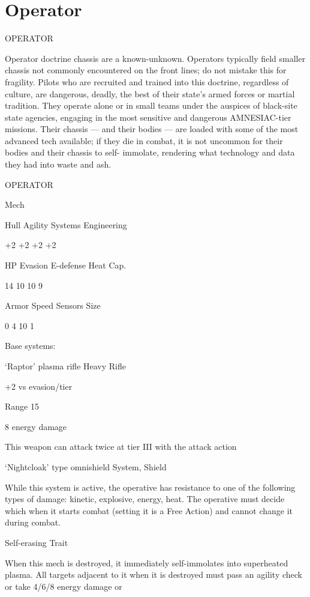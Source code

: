 \section{Operator}

                                              OPERATOR

Operator doctrine chassis are a known-unknown. Operators typically field smaller chassis not
commonly encountered on the front lines; do not mistake this for fragility. Pilots who are recruited
and trained into this doctrine, regardless of culture, are dangerous, deadly, the best of their
state’s armed forces or martial tradition. They operate alone or in small teams under the auspices
of black-site state agencies, engaging in the most sensitive and dangerous AMNESIAC-tier
missions. Their chassis — and their bodies — are loaded with some of the most advanced tech
available; if they die in combat, it is not uncommon for their bodies and their chassis to self-
immolate, rendering what technology and data they had into waste and ash.


 OPERATOR

 Mech

 Hull       Agility      Systems       Engineering

 +2         +2           +2            +2

 HP         Evasion      E-defense     Heat Cap.

 14         10           10            9

 Armor      Speed        Sensors       Size

 0          4            10            1

Base systems:

‘Raptor’ plasma rifle
Heavy Rifle

+2 vs evasion/tier

Range 15

8 energy damage

This weapon can attack twice at tier III with the attack action


‘Nightcloak’ type omnishield
System, Shield

While this system is active, the operative has resistance to one of the following types of damage:
kinetic, explosive, energy, heat. The operative must decide which when it starts combat (setting it
is a Free Action) and cannot change it during combat.


Self-erasing
Trait

When this mech is destroyed, it immediately self-immolates into superheated plasma. All targets
adjacent to it when it is destroyed must pass an agility check or take 4/6/8 energy damage or




